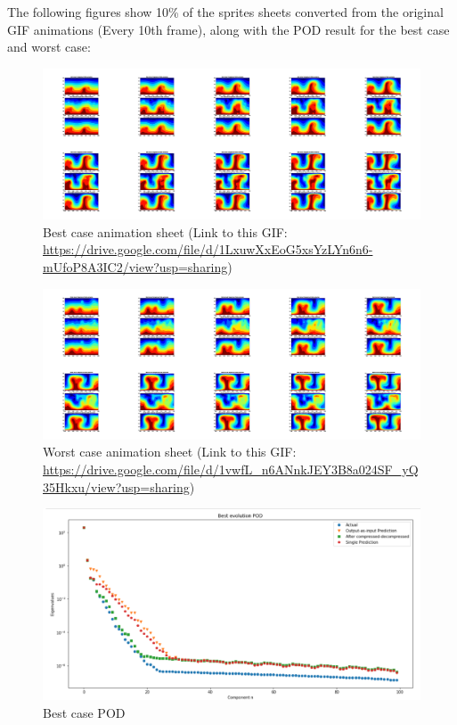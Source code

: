 The following figures show 10\% of the sprites sheets converted from the original GIF animations (Every 10th frame), along with the POD result for the best case and worst case:

\begin{figure}[H]
    \centering
    \caption{Best case animation sheet (Link to this GIF: \url{https://drive.google.com/file/d/1LxuwXxEoG5xsYzLYn6n6-mUfoP8A3IC2/view?usp=sharing})}
    \includegraphics[scale=0.10]{figures/mantle_convection_images/larger_dataset/FNN_Best_GIF_sheet.png}
\end{figure}

\begin{figure}[H]
    \centering
    \caption{Worst case animation sheet (Link to this GIF: 
    \url{https://drive.google.com/file/d/1vwfL_n6ANnkJEY3B8a024SF_yQ35Hkxu/view?usp=sharing})}
    \includegraphics[scale=0.10]{figures/mantle_convection_images/larger_dataset/FNN_Worst_GIF_sheet.png}
\end{figure}


\begin{figure}[H]
    \caption{Best case POD}
    \includegraphics[scale=0.5]{figures/mantle_convection_images/larger_dataset/FNN_Best_POD.png}
\end{figure}

